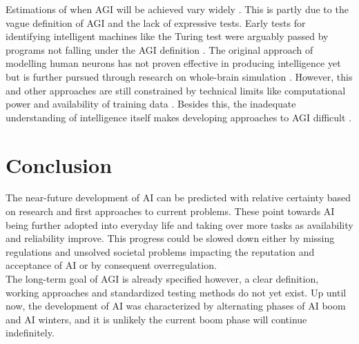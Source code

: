 \documentclass[a4paper, conference]{IEEEtran}
\begin{document}
Estimations of when AGI will be achieved vary widely \cite{scienceAgiDiscussion, zhang2022forecasting, Fjelland2020}. This is partly due to the vague definition of AGI and the lack of expressive tests. Early tests for identifying intelligent machines like the Turing test were arguably passed by programs not falling under the AGI definition \cite[p. 1796]{aiModernApproach}. The original approach of modelling human neurons has not proven effective in producing intelligence yet but is further pursued through research on whole-brain simulation \cite{Stiefel2019}. However, this and other approaches are still constrained by technical limits like computational power and availability of training data \cite[pp. 681-703]{aiStructuresStrategies}. Besides this, the inadequate understanding of intelligence itself makes developing approaches to AGI difficult \cite[pp. 24-29]{littman2022gathering}.\\

\section{Conclusion}
The near-future development of AI can be predicted with relative certainty based on research and first approaches to current problems. These point towards AI being further adopted into everyday life and taking over more tasks as availability and reliability improve. This progress could be slowed down either by missing regulations and unsolved societal problems impacting the reputation and acceptance of AI or by consequent overregulation.\\

The long-term goal of AGI is already specified however, a clear definition, working approaches and standardized testing methods do not yet exist. Up until now, the development of AI was characterized by alternating phases of AI boom and AI winters, and it is unlikely the current boom phase will continue indefinitely.\\

\printbibliography
\end{document}
